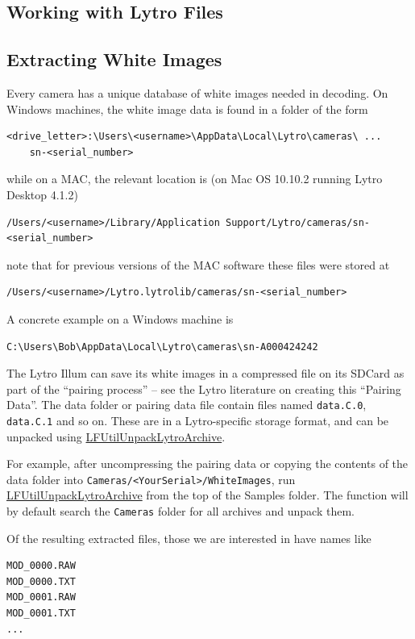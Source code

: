 \documentclass[onecolumn]{article}
\newcommand{\CiteFunc}[1]{\hyperlink{#1}{\small #1}}
\newcommand{\SymbolText}[1]{\texttt{\small #1}}
\begin{document}
\begin{appendices}
\newpage
\section{Working with Lytro Files}
\label{sect_LytroFiles}

\subsection{Extracting White Images}
\label{sect_LytroFiles_Cal}

Every camera has a unique database of white images needed in decoding.  On Windows machines, the white image data is found in a folder of the form
\begin{Verbatim} 
<drive_letter>:\Users\<username>\AppData\Local\Lytro\cameras\ ...
    sn-<serial_number>
\end{Verbatim}
while on a MAC, the relevant location is (on Mac OS 10.10.2 running Lytro Desktop 4.1.2)
\begin{Verbatim} 
/Users/<username>/Library/Application Support/Lytro/cameras/sn-<serial_number>
\end{Verbatim}
note that for previous versions of the MAC software these files were stored at
\begin{Verbatim} 
/Users/<username>/Lytro.lytrolib/cameras/sn-<serial_number>
\end{Verbatim}
A concrete example on a Windows machine is
\begin{Verbatim} 
C:\Users\Bob\AppData\Local\Lytro\cameras\sn-A000424242
\end{Verbatim}

The Lytro Illum can save its white images in a compressed file on its SDCard as part of the ``pairing process'' -- see the Lytro literature on creating this ``Pairing Data''.  The data folder or pairing data file contain files named \SymbolText{data.C.0}, \SymbolText{data.C.1} and so on. These are in a Lytro-specific storage format, and can be unpacked using \CiteFunc{LFUtilUnpackLytroArchive}.  

For example, after uncompressing the pairing data or copying the contents of the data folder into \SymbolText{Cameras/<YourSerial>/WhiteImages}, run \CiteFunc{LFUtilUnpackLytroArchive} from the top of the Samples folder.  The function will by default search the \SymbolText{Cameras} folder for all archives and unpack them.

Of the resulting extracted files, those we are interested in have names like
\begin{Verbatim} 
MOD_0000.RAW
MOD_0000.TXT
MOD_0001.RAW
MOD_0001.TXT
...
\end{Verbatim}


\end{appendices}
\end{document}
